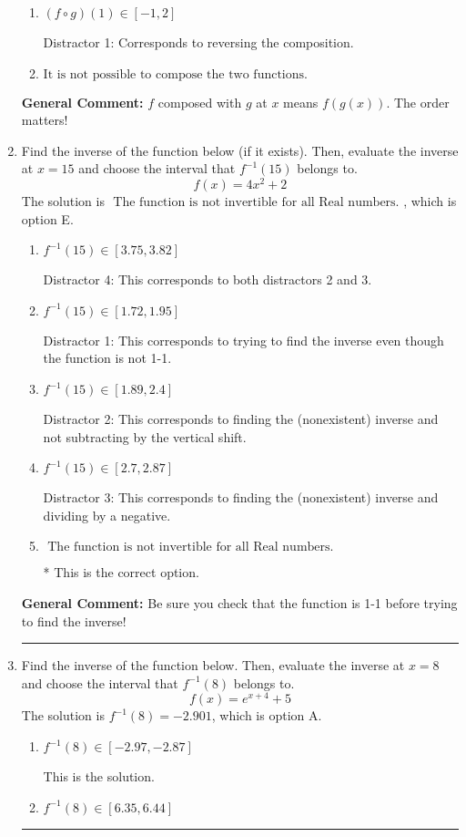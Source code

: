 \documentclass{extbook}[14pt]
\newcommand{\litem}[1]{\item #1

\rule{\textwidth}{0.4pt}}
\begin{document}
\begin{enumerate}
{\begin{enumerate}[label=\Alph*.]
 Distractor 3: Corresponds to being slightly off from the solution.
\item \( (f \circ g)(1) \in [-1, 2] \)

 Distractor 1: Corresponds to reversing the composition.
\item \( \text{It is not possible to compose the two functions.} \)


\end{enumerate}

\textbf{General Comment:} $f$ composed with $g$ at $x$ means $f(g(x))$. The order matters!
}
\litem{
Find the inverse of the function below (if it exists). Then, evaluate the inverse at $x = 15$ and choose the interval that $f^{-1}(15)$ belongs to.
\[ f(x) = 4 x^2 + 2 \]The solution is \( \text{ The function is not invertible for all Real numbers. } \), which is option E.\begin{enumerate}[label=\Alph*.]
\item \( f^{-1}(15) \in [3.75, 3.82] \)

 Distractor 4: This corresponds to both distractors 2 and 3.
\item \( f^{-1}(15) \in [1.72, 1.95] \)

 Distractor 1: This corresponds to trying to find the inverse even though the function is not 1-1. 
\item \( f^{-1}(15) \in [1.89, 2.4] \)

 Distractor 2: This corresponds to finding the (nonexistent) inverse and not subtracting by the vertical shift.
\item \( f^{-1}(15) \in [2.7, 2.87] \)

 Distractor 3: This corresponds to finding the (nonexistent) inverse and dividing by a negative.
\item \( \text{ The function is not invertible for all Real numbers. } \)

* This is the correct option.
\end{enumerate}

\textbf{General Comment:} Be sure you check that the function is 1-1 before trying to find the inverse!
}
\litem{
Find the inverse of the function below. Then, evaluate the inverse at $x = 8$ and choose the interval that $f^{-1}(8)$ belongs to.
\[ f(x) = e^{x+4}+5 \]The solution is \( f^{-1}(8) = -2.901 \), which is option A.\begin{enumerate}[label=\Alph*.]
\item \( f^{-1}(8) \in [-2.97, -2.87] \)

 This is the solution.
\item \( f^{-1}(8) \in [6.35, 6.44] \)


\end{enumerate}}
\end{enumerate}
\end{document}
